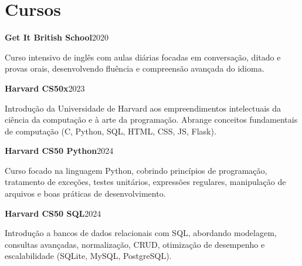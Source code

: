 \section{Cursos}
    \resumeSubHeadingListStart

    \resumeProjectHeading
    {\textbf{Get It British School}}{2020}

    Curso intensivo de inglês com aulas diárias focadas em conversação, ditado e provas orais, desenvolvendo fluência e compreensão avançada do idioma.

    \resumeProjectHeading
    {\textbf{Harvard CS50x}}{2023}

    Introdução da Universidade de Harvard aos empreendimentos intelectuais da ciência da computação e à arte da programação. Abrange conceitos fundamentais de computação (C, Python, SQL, HTML, CSS, JS, Flask).

    \resumeProjectHeading
    {\textbf{Harvard CS50 Python}}{2024}

    Curso focado na linguagem Python, cobrindo princípios de programação, tratamento de exceções, testes unitários, expressões regulares, manipulação de arquivos e boas práticas de desenvolvimento.

    \resumeProjectHeading
    {\textbf{Harvard CS50 SQL}}{2024}

    Introdução a bancos de dados relacionais com SQL, abordando modelagem, consultas avançadas, normalização, CRUD, otimização de desempenho e escalabilidade (SQLite, MySQL, PostgreSQL).
    
    \resumeSubHeadingListEnd
